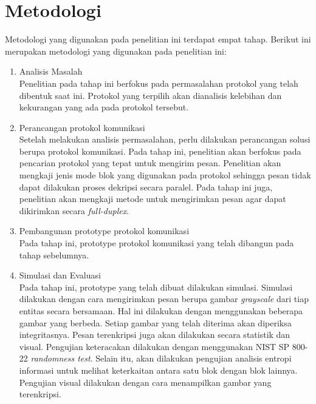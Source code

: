 \section{Metodologi}
Metodologi yang digunakan pada penelitian ini terdapat empat tahap. Berikut ini merupakan metodologi yang digunakan pada penelitian ini:
\begin{enumerate}
  \item Analisis Masalah\\
  Penelitian pada tahap ini berfokus pada permasalahan protokol yang telah dibentuk saat ini. Protokol yang terpilih akan dianalisis kelebihan dan kekurangan yang ada pada protokol tersebut.

  \item Perancangan protokol komunikasi\\
  Setelah melakukan analisis permasalahan, perlu dilakukan perancangan solusi berupa protokol komunikasi. Pada tahap ini, penelitian akan berfokus pada pencarian protokol yang tepat untuk mengirim pesan. Penelitian akan mengkaji jenis mode blok yang digunakan pada protokol sehingga pesan tidak dapat dilakukan proses dekripsi secara paralel. Pada tahap ini juga, penelitian akan mengkaji metode untuk mengirimkan pesan agar dapat dikirimkan secara \emph{full-duplex}.

  \item Pembangunan prototype protokol komunikasi\\
  Pada tahap ini, prototype protokol komunikasi yang telah dibangun pada tahap sebelumnya.

  \item Simulasi dan Evaluasi\\
  Pada tahap ini, prototype yang telah dibuat dilakukan simulasi. Simulasi dilakukan dengan cara mengirimkan pesan berupa gambar \emph{grayscale} dari tiap entitas secara bersamaan. Hal ini dilakukan dengan menggunakan beberapa gambar yang berbeda. Setiap gambar yang telah diterima akan diperiksa integritasnya. Pesan terenkripsi juga akan dilakukan secara statistik dan visual. Pengujian keteracakan dilakukan dengan menggunakan NIST SP 800-22 \emph{randomness test}. Selain itu, akan dilakukan pengujian analisis entropi informasi untuk melihat keterkaitan antara satu blok dengan blok lainnya. Pengujian visual dilakukan dengan cara menampilkan gambar yang terenkripsi.

\end{enumerate}



